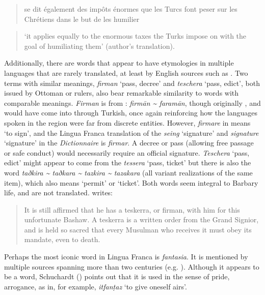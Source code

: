 \documentclass[output=paper]{langsci/langscibook}
\begin{document}
	\begin{quote}
		se dit également des impôts énormes que les Turcs font peser sur les Chrétiens dans le but de les humilier
	\end{quote}
	
	\begin{quote}
		‘it applies equally to the enormous taxes the Turks impose on  with the goal of humiliating them’ (author's translation).
	\end{quote}
	
	Additionally, there are words that appear to have etymologies in multiple languages that are rarely translated, at least by English sources such as \citet{Tully1819}. Two terms with similar meanings, \textit{firman} ‘pass, decree’ and \textit{teschera} ‘pass, edict’, both issued by Ottoman or  rulers, also bear remarkable similarity to  words with comparable meanings. \textit{Firman} is from : \textit{firmān {\textasciitilde} faramān}, though originally , and would have come into  through  {Turkish}, once again reinforcing how the languages spoken in the region were far from discrete entities. However, \textit{firmare} in  means `to sign', and the Lingua Franca translation of the  \textit{seing} ‘signature’ and \textit{signature} ‘signature’ in the \textit{Dictionnaire} is \textit{firmar}. A decree or pass (allowing free passage or safe conduct) would necessarily require an official signature. \textit{Teschera} ‘pass, edict’ might appear to come from the  \textit{tessera} ‘pass, ticket’ but there is also the  word \textit{taðkira {\textasciitilde} taðkara {\textasciitilde} tazkira {\textasciitilde} tazakara} (all variant realizations of the same item), which also means ‘permit’ or ‘ticket’. Both words seem integral to Barbary life, and are not translated. \citet[258]{Tully1819} writes: 
	
	\begin{quote}
		It is still affirmed that he has a teskerra, or firman, with him for this unfortunate Bashaw. A teskerra is a written order from the Grand Signior, and is held so sacred that every Musulman who receives it must obey its mandate, even to death.
	\end{quote}
	
	Perhaps the most iconic word in Lingua Franca is \textit{fantasia}. It is mentioned by multiple sources spanning more than two centuries (e.g. \citealt{Haedo1612,Broughton1839}). Although it appears to be a  word, Schuchardt (\citeyear[71]{Schuchardt1909}) points out that it is used in the  sense of pride, arrogance, as in, for example,  \textit{itfanṭaz} ‘to give oneself airs’.
	
\end{document}
